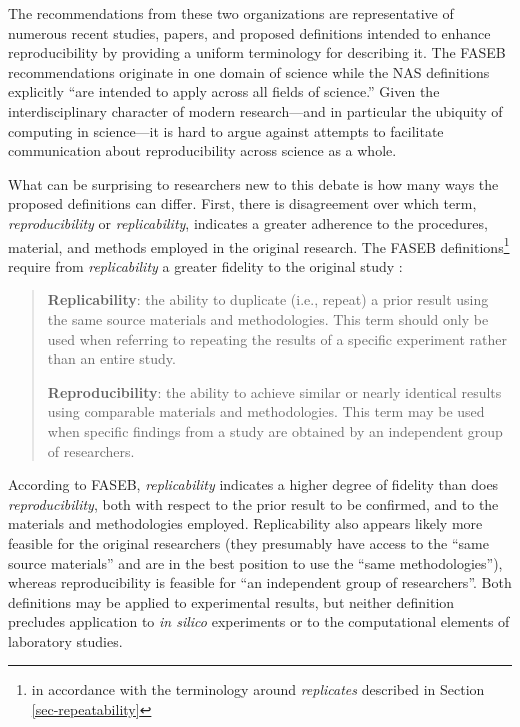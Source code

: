 The recommendations from these two organizations are representative of numerous recent studies, papers,
	and proposed definitions intended to enhance reproducibility by providing a uniform terminology
	for describing it.
The FASEB recommendations originate in one domain of science while the NAS definitions explicitly
	``are intended to apply across all fields of science.''
Given the interdisciplinary character of modern research---and in particular the ubiquity of computing in science---it
	is hard to argue against attempts to facilitate communication about reproducibility across science as a whole.

What can be surprising to researchers new to this debate is how many ways the proposed definitions
	can differ.
First, there is disagreement over which term, \emph{reproducibility} or \emph{replicability}, indicates
	 a greater adherence to the procedures, material, and methods employed in the original research.
The FASEB definitions\footnote{in accordance with the terminology around \emph{replicates} described in Section\,\ref{sec-repeatability}}
	require from \emph{replicability} a greater fidelity to the original study \cite[p.3]{FASEB2016enhancing}:
        \begin{quote}
          \textbf{Replicability}: the ability to duplicate (i.e., repeat) a prior result using the same
          source materials and methodologies. This term should only be used when
					referring to repeating the results of a specific experiment rather than an
					entire study. \medskip

					\textbf{Reproducibility}: the ability to achieve similar or nearly identical results using comparable materials and methodologies.
					This term may be used when specific findings from a study are obtained by an independent group of researchers.
      \end{quote}
According to FASEB, \emph{replicability} indicates a higher degree of fidelity than does \emph{reproducibility},
	both with respect to the prior result to be confirmed, and to the materials and methodologies employed.
Replicability also appears likely more feasible for the original researchers (they presumably have access to the
	``same source materials'' and are in the best position to use the ``same methodologies''), whereas reproducibility is
	feasible for ``an independent group of researchers''.
Both definitions may be applied to experimental results, but neither definition precludes application to \emph{in silico}
	experiments or to the computational elements of laboratory studies.

